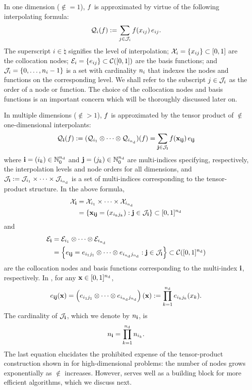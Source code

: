 In one dimension ($\nin = 1$), $f$ is approximated by virtue of the following
interpolating formula:
\begin{equation} \elab{tensor-1d}
  \tensor{i}(\f) := \sum_{j \in \index_i} \f(\x_{ij}) \, \e_{ij}.
\end{equation}
The superscript $i \in \natural$ signifies the level of interpolation; $\mathcal{X}_i =
\{ x_{ij} \} \subset [0, 1]$ are the collocation nodes; $\mathcal{E}_i = \{ e_{ij} \}
\subset \mathcal{C}([0, 1])$ are the basis functions; and $\mathcal{J}_i = \{ 0,
\dots, n_i - 1 \}$ is a set with cardinality $n_i$ that indexes the nodes and
functions on the corresponding level. We shall refer to the subscript $j \in
\mathcal{J}_i$ as the order of a node or function. The choice of the collocation
nodes and basis functions is an important concern which will be thoroughly
discussed later on.

In multiple dimensions ($\nin > 1$), $f$ is approximated by the tensor product
of $\nin$ one-dimensional interpolants:
\begin{equation} \elab{tensor}
  \tensor{\vi}(\f) := (\tensor{i_1} \otimes \cdots \otimes \tensor{i_\nin})(\f) = \sum_{\vj \in \index_\vi} \f(\vx_{\vi\vj}) \, \e_{\vi\vj}
\end{equation}
where $\mathbf{i} = (i_k) \in \mathbb{N}_0^{n_\text{d}}$ and $\mathbf{j} = (j_k) \in \mathbb{N}_0^{n_\text{d}}$ are
multi-indices specifying, respectively, the interpolation levels and node orders
for all dimensions, and $\mathcal{J}_{\mathbf{i}} := \mathcal{J}_{i_1} \times \cdots \times
\mathcal{J}_{i_{n_\text{d}}}$ is a set of multi-indices corresponding to the tensor-product
structure. In the above formula,
\begin{align}
  \X_\vi &= \X_{i_1} \times \cdots \times \X_{i_\nin} \elab{collocation-nodes} \\
         &= \left\{ \vx_{\vi\vj} = (\x_{i_k j_k}): \vj \in \index_\vi \right\} \subset [0, 1]^\nin \nonumber
\end{align}
and
\begin{align}
  \E_\vi &= \E_{i_1} \otimes \cdots \otimes \E_{i_\nin} \elab{basis-functions} \\
         &= \left\{ \e_{\vi\vj} = \e_{i_1 j_1} \otimes \cdots \otimes \e_{i_\nin j_\nin}: \vj \in \index_\vi \right\} \subset \continuous([0, 1]^\nin) \nonumber
\end{align}
are the collocation nodes and basis functions corresponding to the multi-index
$\mathbf{i}$, respectively. In , for any $\mathbf{x} \in [0, 1]^{n_\text{d}}$,
\[
  e_{\mathbf{i}\mathbf{j}}(\mathbf{x}) = \left(e_{i_1 j_1} \otimes \cdots \otimes e_{i_{n_\text{d}} j_{n_\text{d}}}\right)(\mathbf{x}) := \prod_{k = 1}^{n_\text{d}} e_{i_k j_k}(x_k).
\]
The cardinality of $\mathcal{J}_{\mathbf{i}}$, which we denote by $n_{\mathbf{i}}$, is
\begin{equation} \elab{tensor-cardinality}
  \n_\vi = \prod_{k = 1}^\nin \n_{i_k}.
\end{equation}
The last equation elucidates the prohibited expense of the tensor-product
construction shown in  for high-dimensional problems: the number of
nodes grows exponentially as $\nin$ increases. However,  serves
well as a building block for more efficient algorithms, which we discuss next.

